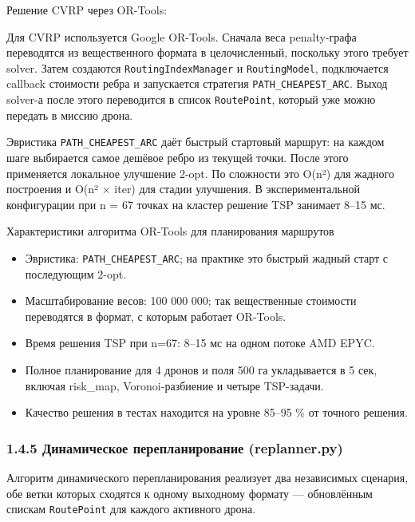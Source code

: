 \documentclass[14pt,a4paper]{extarticle}
\begin{document}
Решение CVRP через OR-Tools:

Для CVRP используется Google OR-Tools. Сначала веса penalty-графа переводятся из вещественного формата в целочисленный, поскольку этого требует solver. Затем создаются \texttt{RoutingIndexManager} и \texttt{RoutingModel}, подключается callback стоимости ребра и запускается стратегия \texttt{PATH\_CHEAPEST\_ARC}. Выход solver-а после этого переводится в список \texttt{RoutePoint}, который уже можно передать в миссию дрона.


Эвристика \texttt{PATH\_CHEAPEST\_ARC} даёт быстрый стартовый маршрут: на каждом шаге выбирается самое дешёвое ребро из текущей точки. После этого применяется локальное улучшение 2-opt. По сложности это O(n²) для жадного построения и O(n² × iter) для стадии улучшения. В экспериментальной конфигурации при n = 67 точках на кластер решение TSP занимает 8--15 мс.

Характеристики алгоритма OR-Tools для планирования маршрутов
\begin{itemize}
\item Эвристика: \texttt{PATH\_CHEAPEST\_ARC}; на практике это быстрый жадный старт с последующим 2-opt.
\item Масштабирование весов: 100 000 000; так вещественные стоимости переводятся в формат, с которым работает OR-Tools.
\item Время решения TSP при n=67: 8--15 мс на одном потоке AMD EPYC.
\item Полное планирование для 4 дронов и поля 500 га укладывается в 5 сек, включая risk\_map, Voronoi-разбиение и четыре TSP-задачи.
\item Качество решения в тестах находится на уровне 85--95 \% от точного решения.
\end{itemize}


\hypertarget{ux434ux438ux43dux430ux43cux438ux447ux435ux441ux43aux43eux435-ux43fux435ux440ux435ux43fux43bux430ux43dux438ux440ux43eux432ux430ux43dux438ux435-replanner.py}{%
\subsubsection{1.4.5 Динамическое перепланирование (replanner.py)}\label{ux434ux438ux43dux430ux43cux438ux447ux435ux441ux43aux43eux435-ux43fux435ux440ux435ux43fux43bux430ux43dux438ux440ux43eux432ux430ux43dux438ux435-replanner.py}}

Алгоритм динамического перепланирования реализует два независимых сценария, обе ветки которых сходятся к одному выходному формату --- обновлённым спискам \texttt{RoutePoint} для каждого активного дрона.
\end{document}
